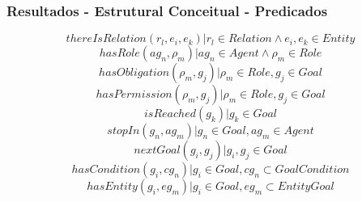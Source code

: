 \documentclass{beamer}
\begin{document}
\begin{frame}
	\frametitle{Resultados - Estrutural Conceitual - Predicados}
	\begin{equation}
		thereIsRelation(r_l,e_i,e_k) | r_l \in Relation \wedge  e_i, e_k \in Entity
	\end{equation}
	\begin{equation}	
		hasRole(ag_n,\rho_m) | ag_n \in Agent \wedge \rho_m \in Role 	
	\end{equation}
	\begin{equation}	
		hasObligation(\rho_m,g_j) | \rho_m \in Role, g_j \in Goal 
	\end{equation}		
	\begin{equation}	
		hasPermission(\rho_m, g_j) | \rho_m \in Role, g_j \in Goal
	\end{equation}
	\begin{equation}		
		isReached(g_k) | g_k \in Goal 
	\end{equation}
	\begin{equation}			
		stopIn(g_n, ag_m) | g_n \in Goal, ag_m \in Agent
	\end{equation}
	\begin{equation}			
		nextGoal(g_i,g_j) |g_i, g_j \in Goal
	\end{equation}
	\begin{equation}				
		hasCondition(g_i,cg_n) | g_i \in Goal, cg_n \subset GoalCondition
	\end{equation}
	\begin{equation}				
		hasEntity(g_i,eg_m) | g_i \in Goal, eg_m \subset EntityGoal 
	\end{equation}
	
\end{frame}
\end{document}
